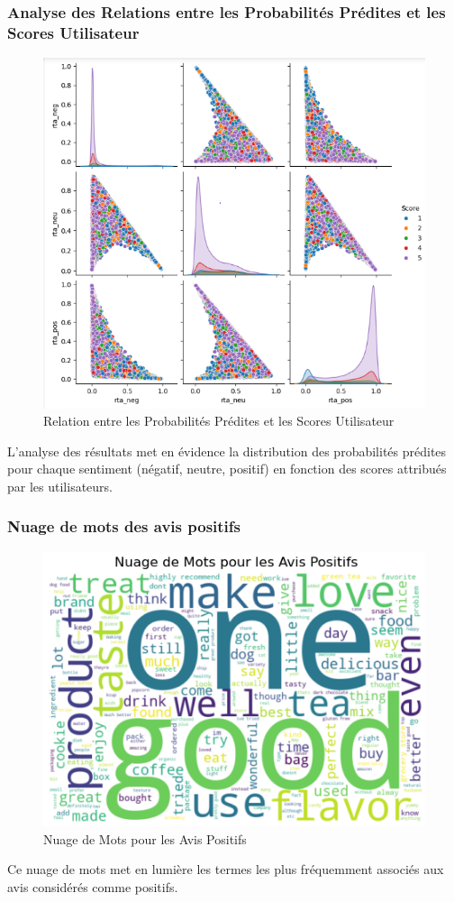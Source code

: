 \begin{frame}
    \frametitle{Analyse des Relations entre les Probabilités Prédites et les Scores Utilisateur}
    \begin{figure}
        \includegraphics[scale=0.3]{Figures/robertaandscoreproba.PNG}
        \caption{Relation entre les Probabilités Prédites et les Scores Utilisateur}
    \end{figure}
    L'analyse des résultats met en évidence la distribution des probabilités prédites pour chaque sentiment (négatif, neutre, positif) en fonction des scores attribués par les utilisateurs.
\end{frame}

\begin{frame}
    \frametitle{Nuage de mots des avis positifs}
    \begin{figure}
        \includegraphics[scale=0.3]{Figures/wordcloudpositive.PNG}
        \caption{Nuage de Mots pour les Avis Positifs}
    \end{figure}
    Ce nuage de mots met en lumière les termes les plus fréquemment associés aux avis considérés comme positifs.
\end{frame}

